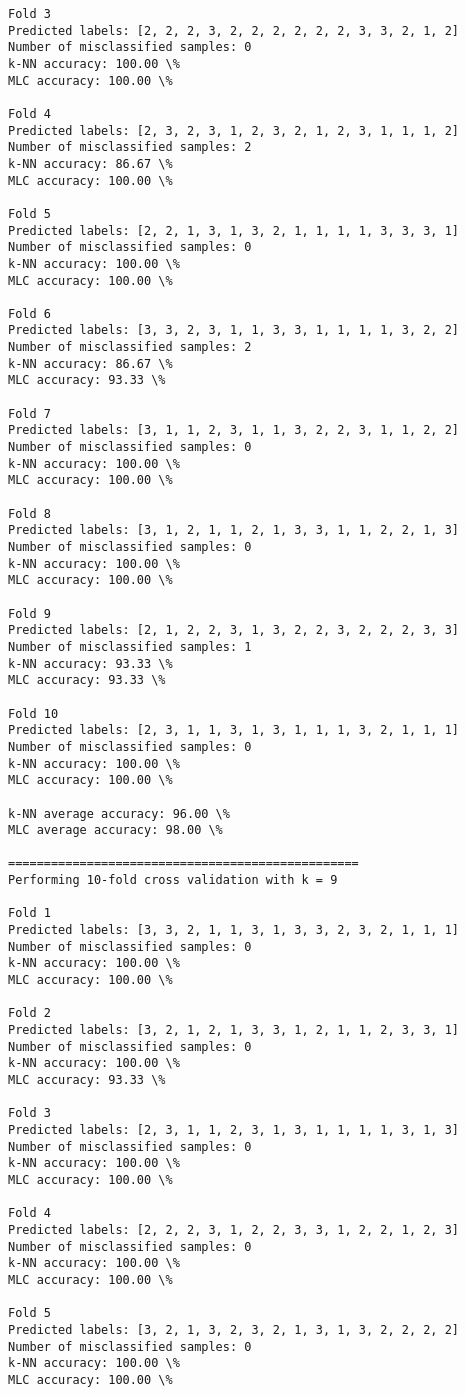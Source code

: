 \documentclass[11pt]{article}
\begin{document}
\begin{Verbatim}[commandchars=\\\{\}]
Fold 3
Predicted labels: [2, 2, 2, 3, 2, 2, 2, 2, 2, 2, 3, 3, 2, 1, 2]
Number of misclassified samples: 0
k-NN accuracy: 100.00 \%
MLC accuracy: 100.00 \%

Fold 4
Predicted labels: [2, 3, 2, 3, 1, 2, 3, 2, 1, 2, 3, 1, 1, 1, 2]
Number of misclassified samples: 2
k-NN accuracy: 86.67 \%
MLC accuracy: 100.00 \%

Fold 5
Predicted labels: [2, 2, 1, 3, 1, 3, 2, 1, 1, 1, 1, 3, 3, 3, 1]
Number of misclassified samples: 0
k-NN accuracy: 100.00 \%
MLC accuracy: 100.00 \%

Fold 6
Predicted labels: [3, 3, 2, 3, 1, 1, 3, 3, 1, 1, 1, 1, 3, 2, 2]
Number of misclassified samples: 2
k-NN accuracy: 86.67 \%
MLC accuracy: 93.33 \%

Fold 7
Predicted labels: [3, 1, 1, 2, 3, 1, 1, 3, 2, 2, 3, 1, 1, 2, 2]
Number of misclassified samples: 0
k-NN accuracy: 100.00 \%
MLC accuracy: 100.00 \%

Fold 8
Predicted labels: [3, 1, 2, 1, 1, 2, 1, 3, 3, 1, 1, 2, 2, 1, 3]
Number of misclassified samples: 0
k-NN accuracy: 100.00 \%
MLC accuracy: 100.00 \%

Fold 9
Predicted labels: [2, 1, 2, 2, 3, 1, 3, 2, 2, 3, 2, 2, 2, 3, 3]
Number of misclassified samples: 1
k-NN accuracy: 93.33 \%
MLC accuracy: 93.33 \%

Fold 10
Predicted labels: [2, 3, 1, 1, 3, 1, 3, 1, 1, 1, 3, 2, 1, 1, 1]
Number of misclassified samples: 0
k-NN accuracy: 100.00 \%
MLC accuracy: 100.00 \%

k-NN average accuracy: 96.00 \%
MLC average accuracy: 98.00 \%

=================================================
Performing 10-fold cross validation with k = 9

Fold 1
Predicted labels: [3, 3, 2, 1, 1, 3, 1, 3, 3, 2, 3, 2, 1, 1, 1]
Number of misclassified samples: 0
k-NN accuracy: 100.00 \%
MLC accuracy: 100.00 \%

Fold 2
Predicted labels: [3, 2, 1, 2, 1, 3, 3, 1, 2, 1, 1, 2, 3, 3, 1]
Number of misclassified samples: 0
k-NN accuracy: 100.00 \%
MLC accuracy: 93.33 \%

Fold 3
Predicted labels: [2, 3, 1, 1, 2, 3, 1, 3, 1, 1, 1, 1, 3, 1, 3]
Number of misclassified samples: 0
k-NN accuracy: 100.00 \%
MLC accuracy: 100.00 \%

Fold 4
Predicted labels: [2, 2, 2, 3, 1, 2, 2, 3, 3, 1, 2, 2, 1, 2, 3]
Number of misclassified samples: 0
k-NN accuracy: 100.00 \%
MLC accuracy: 100.00 \%

Fold 5
Predicted labels: [3, 2, 1, 3, 2, 3, 2, 1, 3, 1, 3, 2, 2, 2, 2]
Number of misclassified samples: 0
k-NN accuracy: 100.00 \%
MLC accuracy: 100.00 \%


\end{Verbatim}
\end{document}
